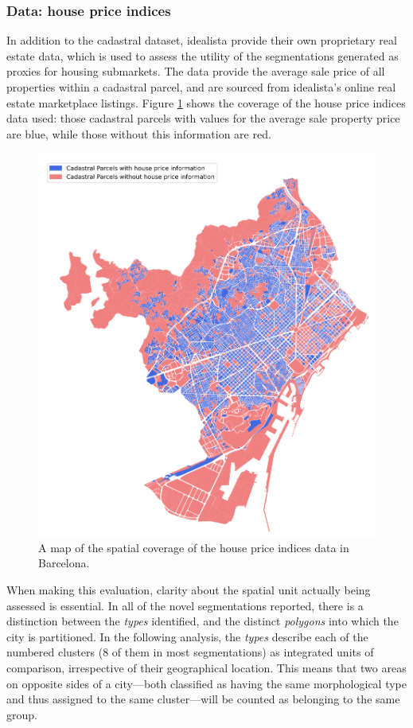 \documentclass[a4paper, nobind]{templates/ociamthesis}
\begin{document}
\hypertarget{data-house-price-indices}{%
\subsubsection{Data: house price indices}\label{data-house-price-indices}}

In addition to the cadastral dataset, idealista provide their own proprietary real estate data, which is used to assess the utility of the segmentations generated as proxies for housing submarkets. The data provide the average sale price of all properties within a cadastral parcel, and are sourced from idealista's online real estate marketplace listings. Figure \ref{fig:house-price-coverage} shows the coverage of the house price indices data used: those cadastral parcels with values for the average sale property price are blue, while those without this information are red.

\begin{figure}

{\centering \includegraphics[width=0.65\linewidth]{figures/maps/house_data_map} 

}

\caption[House price indices coverage map.]{A map of the spatial coverage of the house price indices data in Barcelona.}\label{fig:house-price-coverage}
\end{figure}

When making this evaluation, clarity about the spatial unit actually being assessed is essential. In all of the novel segmentations reported, there is a distinction between the \emph{types} identified, and the distinct \emph{polygons} into which the city is partitioned. In the following analysis, the \emph{types} describe each of the numbered clusters (8 of them in most segmentations) as integrated units of comparison, irrespective of their geographical location. This means that two areas on opposite sides of a city---both classified as having the same morphological type and thus assigned to the same cluster---will be counted as belonging to the same group.
\end{document}
